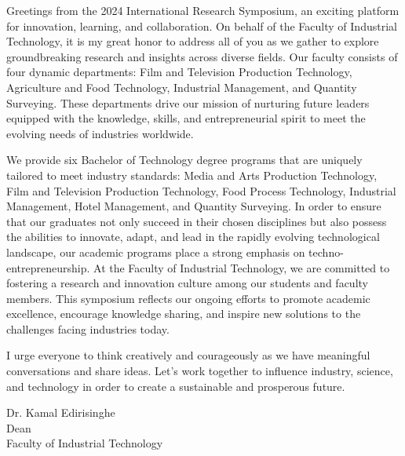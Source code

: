 \thispagestyle{fancy}
	




   
    



	
	Greetings from the 2024 International Research Symposium, an exciting platform for innovation, learning, and collaboration. On behalf of the Faculty of Industrial Technology, it is my great honor to address all of you as we gather to explore groundbreaking research and insights across diverse fields.
Our faculty consists of four dynamic departments: Film and Television Production Technology, Agriculture and Food Technology, Industrial Management, and Quantity Surveying. These departments drive our mission of nurturing future leaders equipped with the knowledge, skills, and entrepreneurial spirit to meet the evolving needs of industries worldwide.

We provide six Bachelor of Technology degree programs that are uniquely tailored to meet industry standards: Media and Arts Production Technology, Film and Television Production Technology, Food Process Technology, Industrial Management, Hotel Management, and Quantity Surveying. In order to ensure that our graduates not only succeed in their chosen disciplines but also possess the abilities to innovate, adapt, and lead in the rapidly evolving technological landscape, our academic programs place a strong emphasis on techno-entrepreneurship. At the Faculty of Industrial Technology, we are committed to fostering a research and innovation culture among our students and faculty members. This symposium reflects our ongoing efforts to promote academic excellence, encourage knowledge sharing, and inspire new solutions to the challenges facing industries today.

I urge everyone to think creatively and courageously as we have meaningful conversations and share ideas. Let's work together to influence industry, science, and technology in order to create a sustainable and prosperous future.

	
	\vspace{1cm}
	Dr. Kamal Edirisinghe\\
Dean\\
Faculty of Industrial Technology

\newpage